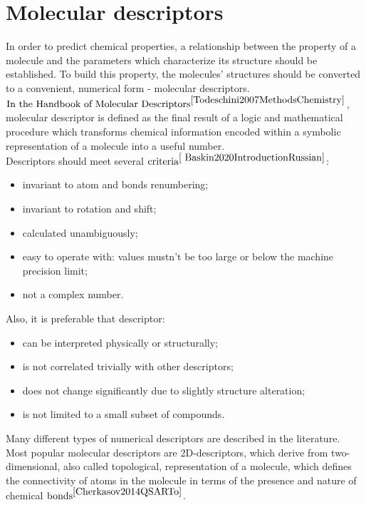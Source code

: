 \section{Molecular descriptors}
  In order to predict chemical properties, a relationship between the property of a molecule and the parameters which characterize its structure should be established.
  To build this property, the molecules' structures should be converted to a convenient, numerical form - molecular descriptors.
  $\text{In the Handbook of Molecular Descriptors}^{\cite{Todeschini2007MethodsChemistry}}$,
  molecular descriptor is defined as the final result of a logic and mathematical procedure which transforms chemical information encoded within a symbolic representation of a molecule into a useful number. \\

\noindent Descriptors should meet several $\text{criteria}^{\cite{
Baskin2020IntroductionRussian}}$:
\begin{itemize}
    \item invariant to atom and bonds renumbering;
    \item invariant to rotation and shift;
    \item calculated unambiguously;
    \item easy to operate with: values mustn't be too large or below the machine precision limit;
    \item not a complex number.
\end{itemize}
\hfill\break
Also, it is preferable that descriptor:
\begin{itemize}
    \item can be interpreted physically or structurally;
    \item is not correlated trivially with other descriptors;
    \item does not change significantly due to slightly structure alteration;
    \item is not limited to a small subset of compounds.
\end{itemize}

\noindent Many different types of numerical descriptors are described in the literature. 
Most popular molecular descriptors are 2D-descriptors, which derive from two-dimensional, also called topological, representation of a molecule, which defines the connectivity of atoms in the molecule in terms of the presence and nature of chemical $\text{bonds}^{\cite{Cherkasov2014QSARTo}}$. 

